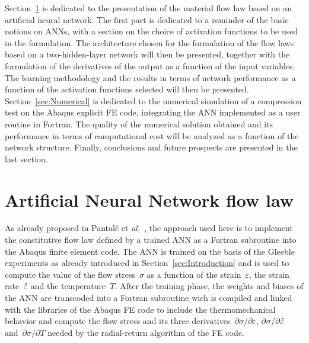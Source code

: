 \documentclass[algorithms,article,submit,pdftex,oneauthors]{Definitions/mdpi}
\makeatletter
\DeclareRobustCommand{\mdot}[1]{\accentset{\mbox{\bfseries .}}{#1}}
\DeclareRobustCommand{\eal}{et \emph{al.}\@\xspace}
\makeatother
\begin{document}
Section~\ref{sec:ANN} is dedicated to the presentation of the material flow law based on an artificial neural network.
The first part is dedicated to a reminder of the basic notions on ANNs, with a section on the choice of activation functions to be used in the formulation.
The architecture chosen for the formulation of the flow laws based on a two-hidden-layer network will then be presented, together with the formulation of the derivatives of the output as a function of the input variables.
The learning methodology and the results in terms of network performance as a function of the activation functions selected will then be presented.
Section~\ref{sec:Numerical} is dedicated to the numerical simulation of a compression test on the Abaqus explicit FE code, integrating the ANN implemented as a user routine in Fortran.
The quality of the numerical solution obtained and its performance in terms of computational cost will be analyzed as a function of the network structure.
Finally, conclusions and future prospects are presented in the last section.

\section{Artificial Neural Network flow law}\label{sec:ANN}

As already proposed in Pantalé \eal~\cite{Pantale-2021-EIN, Pantale-2023-DIA}, the approach used here is to implement the constitutive flow law defined by a trained ANN as a Fortran subroutine into the Abaqus finite element code.
The ANN is trained on the basis of the Gleeble experiments as already introduced in Section~\ref{sec:Introduction} and is used to compute the value of the flow stress~$\sigma$ as a function of the strain~$\varepsilon$, the strain rate~$\mdot{\varepsilon}$ and the temperature~$T$.
After the training phase, the weights and biases of the ANN are transcoded into a Fortran subroutine wich is compiled and linked with the libraries of the Abaqus FE code to include the thermomechanical behavior and compute the flow stress and its three derivatives~$\partial\sigma/\partial\varepsilon$, $\partial\sigma/\partial\mdot{\varepsilon}$ and~$\partial\sigma/\partial T$ needed by the radial-return algorithm of the FE code.

\end{document}
